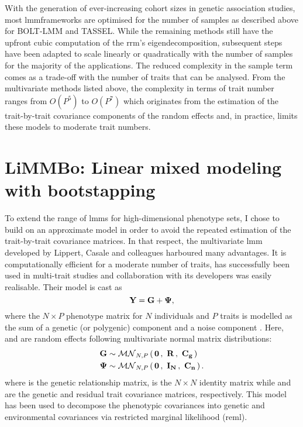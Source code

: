 With the generation of ever-increasing cohort sizes in genetic association studies, most \gls{lmm}frameworks are optimised for the number of samples as described above for BOLT-LMM and TASSEL. While the remaining methods still have the upfront cubic computation of the  \gls{rrm}'s eigendecomposition, subsequent steps have been adapted to scale linearly or quadratically with the number of samples for the majority of the applications. The reduced complexity in the sample term comes as a trade-off with the number of traits that can be analysed. From the multivariate methods listed above, the complexity in terms of trait number ranges from \(O(P^5)\) to \(O(P^7)\) which originates from the estimation of the trait-by-trait covariance components of the random effects and, in practice, limits these models to moderate trait numbers.

\section{LiMMBo: Linear mixed modeling with bootstapping}
\label{section:intro-limmbo}
To extend the range of \glspl{lmm} for high-dimensional phenotype sets, I chose to build on an approximate model in order to avoid the repeated estimation of the trait-by-trait covariance matrices. In that respect, the multivariate \gls{lmm} developed by Lippert, Casale and colleagues \citep{Lippert2014,Casale2015} harboured many advantages. It is computationally efficient for a moderate number of traits, has successfully  been used in multi-trait studies \citep{Cannavo2016,Schor2017} and collaboration with its developers was easily realisable. 
Their model is cast as
\begin{equation}
\boldsymbol{\mathbf{Y}} = \boldsymbol{\mathbf{G}} + \boldsymbol{\mathbf{\Psi}},
\label{eq:vd}
\end{equation}
%
where the \(N \times P\) phenotype matrix  for \(N\) individuals and \(P\) traits is modelled as the sum of a genetic (or polygenic) component  and a noise component \tmat{\Psi}. Here,  and  are random effects following multivariate normal matrix distributions:
\begin{equation}
\begin{aligned}
\boldsymbol{\mathbf{G}} &\sim\mathcal{MN}_{N,P}\left(\, \boldsymbol{\mathbf{{\boldsymbol{\mathbf{0}}}}} \,,~\boldsymbol{\mathbf{{\boldsymbol{\mathbf{R}}}}}\,,~\boldsymbol{\mathbf{{\boldsymbol{\mathbf{C}}_{g}}}} \,\right)  \\
\boldsymbol{\mathbf{\Psi}} &\sim\mathcal{MN}_{N,P}\left(\, \boldsymbol{\mathbf{{\boldsymbol{\mathbf{0}}}}} \,,~\boldsymbol{\mathbf{{\boldsymbol{\mathbf{I}}_N}}}\,,~\boldsymbol{\mathbf{{\boldsymbol{\mathbf{C}}_{n}}}} \,\right).
\end{aligned}
\end{equation}
%
where  is the genetic relationship matrix,  is the \(N \times N\) identity matrix while  and  are the genetic and residual trait covariance matrices, respectively. This model has been used to decompose the phenotypic covariances into genetic and environmental covariances via restricted marginal likelihood (\gls{reml}). 

